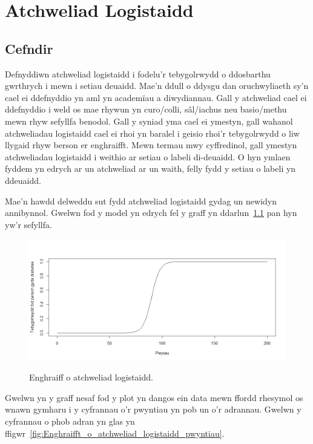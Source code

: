 \chapter{Atchweliad Logistaidd}\label{cha:Atchweliad_logistaidd}
\section{Cefndir}
Defnyddiwn atchweliad logistaidd i fodelu'r tebygolrwydd o ddosbarthu gwrthrych i mewn i setiau deuaidd. Mae'n ddull o ddysgu dan oruchwyliaeth sy'n cael ei ddefnyddio yn aml yn academ\"{i}au a diwydiannau. Gall y atchweliad cael ei ddefnyddio i weld os mae rhywun yn curo/colli, s\^{a}l/iachus neu basio/methu mewn rhyw sefyllfa benodol. Gall y syniad yma cael ei ymestyn, gall wahanol atchweliadau logistaidd cael ei rhoi yn baralel i geisio rhoi'r tebygolrwydd o liw llygaid rhyw berson er enghraifft. Mewn termau mwy cyffredinol, gall ymestyn atchweliadau logistaidd i weithio ar setiau o labeli di-deuaidd. O hyn ymlaen fyddem yn edrych ar un atchweliad ar un waith, felly fydd y setiau o labeli yn ddeuaidd. %

Mae'n hawdd delweddu sut fydd atchweliad logistaidd gydag un newidyn annibynnol. Gwelwn fod y model yn edrych fel y graff yn ddarlun~\ref{fig:Enghraifft_o_atchweliad_logistaidd} pan hyn yw'r sefyllfa.

\begin{figure}[H]
\begin{center}
\includegraphics[width=0.5\linewidth]{../img/Atchweliad_logistaidd.jpeg}
\label{fig:Enghraifft_o_atchweliad_logistaidd}
\caption{Enghraiff o atchweliad logistaidd.}
\end{center}
\end{figure}

Gwelwn yn y graff nesaf fod y plot yn dangos ein data mewn ffordd rhesymol os wnawn gymharu i y cyfrannau o'r pwyntiau yn pob un o'r adrannau. Gwelwn y cyfrannau o phob adran yn glas yn ffigwr~\ref{fig:Enghraifft_o_atchweliad_logistaidd_pwyntiau}. 

